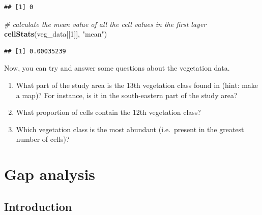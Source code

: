 \documentclass[
  12pt,
]{book}
\makeatletter
\newenvironment{Shaded}{\begin{snugshade}}{\end{snugshade}}
\newcommand{\CommentTok}[1]{\textcolor[rgb]{0.56,0.35,0.01}{\textit{#1}}}
\newcommand{\DecValTok}[1]{\textcolor[rgb]{0.00,0.00,0.81}{#1}}
\newcommand{\KeywordTok}[1]{\textcolor[rgb]{0.13,0.29,0.53}{\textbf{#1}}}
\newcommand{\NormalTok}[1]{#1}
\newcommand{\StringTok}[1]{\textcolor[rgb]{0.31,0.60,0.02}{#1}}
\providecommand{\tightlist}{%
  \setlength{\itemsep}{0pt}\setlength{\parskip}{0pt}}
\newenvironment{kframe}{%
\medskip{}
\setlength{\fboxsep}{.8em}
 \def\at@end@of@kframe{}%
 \ifinner\ifhmode%
  \def\at@end@of@kframe{\end{minipage}}%
  \begin{minipage}{\columnwidth}%
 \fi\fi%
 \def\FrameCommand##1{\hskip\@totalleftmargin \hskip-\fboxsep
 \colorbox{shadecolor}{##1}\hskip-\fboxsep
     \hskip-\linewidth \hskip-\@totalleftmargin \hskip\columnwidth}%
 \MakeFramed {\advance\hsize-\width
   \@totalleftmargin\z@ \linewidth\hsize
   \@setminipage}}%
 {\par\unskip\endMakeFramed%
 \at@end@of@kframe}
\newenvironment{rmdblock}[1]
  {
  \begin{itemize}
  \renewcommand{\labelitemi}{
    \raisebox{-.7\height}[0pt][0pt]{
      {\setkeys{Gin}{width=3em,keepaspectratio}\texttt{[image: images/\#1]}}
    }
  }
  \setlength{\fboxsep}{1em}
  \begin{kframe}
  \item
  }
  {
  \end{kframe}
  \end{itemize}
  }
\newenvironment{rmdquestion}
  {\begin{rmdblock}{question}}
  {\end{rmdblock}}
\makeatother
\begin{document}
\begin{verbatim}
## [1] 0
\end{verbatim}

\begin{Shaded}
\begin{Highlighting}[]
\CommentTok{# calculate the mean value of all the cell values in the first layer}
\KeywordTok{cellStats}\NormalTok{(veg_data[[}\DecValTok{1}\NormalTok{]], }\StringTok{"mean"}\NormalTok{)}
\end{Highlighting}
\end{Shaded}

\begin{verbatim}
## [1] 0.00035239
\end{verbatim}

Now, you can try and answer some questions about the vegetation data.

\begin{rmdquestion}
\begin{enumerate}
\def\labelenumi{\arabic{enumi}.}
\tightlist
\item
  What part of the study area is the 13th vegetation class found in (hint: make a map)? For instance, is it in the south-eastern part of the study area?
\item
  What proportion of cells contain the 12th vegetation class?
\item
  Which vegetation class is the most abundant (i.e.~present in the greatest number of cells)?
\end{enumerate}
\end{rmdquestion}

\hypertarget{gap-analysis}{%
\chapter{Gap analysis}\label{gap-analysis}}

\hypertarget{introduction-1}{%
\section{Introduction}\label{introduction-1}}
\end{document}
